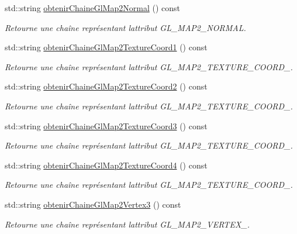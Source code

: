 \begin{DoxyCompactItemize}
std\+::string \hyperlink{group__utilitaire_ga281e64b376bb0c3f7f7090820a64bd7e}{obtenir\+Chaine\+Gl\+Map2\+Normal} () const 
\begin{DoxyCompactList}\small\item\em Retourne une chaîne représentant l\textquotesingle{}attribut G\+L\+\_\+\+M\+A\+P2\+\_\+\+N\+O\+R\+M\+A\+L. \end{DoxyCompactList}\item 
std\+::string \hyperlink{group__utilitaire_gadb7c67ea193286a4088b9dcc172abef6}{obtenir\+Chaine\+Gl\+Map2\+Texture\+Coord1} () const 
\begin{DoxyCompactList}\small\item\em Retourne une chaîne représentant l\textquotesingle{}attribut G\+L\+\_\+\+M\+A\+P2\+\_\+\+T\+E\+X\+T\+U\+R\+E\+\_\+\+C\+O\+O\+R\+D\+\_. \end{DoxyCompactList}\item 
std\+::string \hyperlink{group__utilitaire_gaf5cb23274f1ad4c504c5aed7947a3432}{obtenir\+Chaine\+Gl\+Map2\+Texture\+Coord2} () const 
\begin{DoxyCompactList}\small\item\em Retourne une chaîne représentant l\textquotesingle{}attribut G\+L\+\_\+\+M\+A\+P2\+\_\+\+T\+E\+X\+T\+U\+R\+E\+\_\+\+C\+O\+O\+R\+D\+\_. \end{DoxyCompactList}\item 
std\+::string \hyperlink{group__utilitaire_gad4b636ae980e2c420c9a7357fe8d58cc}{obtenir\+Chaine\+Gl\+Map2\+Texture\+Coord3} () const 
\begin{DoxyCompactList}\small\item\em Retourne une chaîne représentant l\textquotesingle{}attribut G\+L\+\_\+\+M\+A\+P2\+\_\+\+T\+E\+X\+T\+U\+R\+E\+\_\+\+C\+O\+O\+R\+D\+\_. \end{DoxyCompactList}\item 
std\+::string \hyperlink{group__utilitaire_ga0716a8c85e544f43620ea6664c58b570}{obtenir\+Chaine\+Gl\+Map2\+Texture\+Coord4} () const 
\begin{DoxyCompactList}\small\item\em Retourne une chaîne représentant l\textquotesingle{}attribut G\+L\+\_\+\+M\+A\+P2\+\_\+\+T\+E\+X\+T\+U\+R\+E\+\_\+\+C\+O\+O\+R\+D\+\_. \end{DoxyCompactList}\item 
std\+::string \hyperlink{group__utilitaire_ga7d031ab910660e0f56b3ed4a95d2bfc6}{obtenir\+Chaine\+Gl\+Map2\+Vertex3} () const 
\begin{DoxyCompactList}\small\item\em Retourne une chaîne représentant l\textquotesingle{}attribut G\+L\+\_\+\+M\+A\+P2\+\_\+\+V\+E\+R\+T\+E\+X\+\_. \end{DoxyCompactList}\item 

\end{DoxyCompactItemize}
